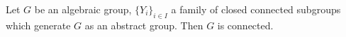 Let $G$ be an algebraic group, $\{Y_i\}_{i \in I}$ a family of closed connected subgroups which generate $G$ as an abstract group. Then $G$ is connected.
